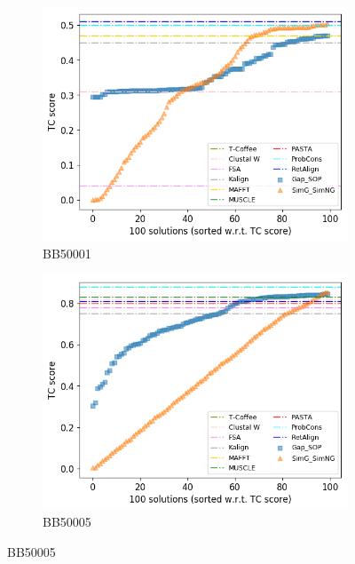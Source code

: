 \begin{figure}[!htbp]
	
	\begin{adjustwidth}{-1cm}{-1cm}
		\centering
		\begin{subfigure}{0.22\textwidth}
			\includegraphics[width=\columnwidth]{Figure/summary/precomputedInit/Balibase/BB50001_tc_density_single_run_2}
			\caption{BB50001}
		\end{subfigure}	
		\begin{subfigure}{0.22\textwidth}
			\includegraphics[width=\columnwidth]{Figure/summary/precomputedInit/Balibase/BB50005_tc_density_single_run_2}
			\caption{BB50005}

\end{subfigure}
\end{adjustwidth}
\end{figure}
